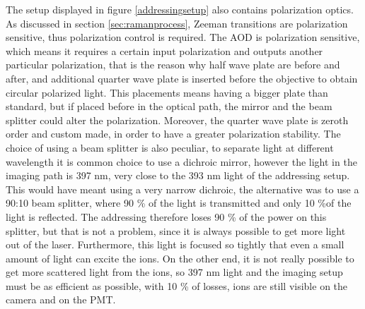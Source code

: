 The setup displayed in figure \ref{addressingsetup} also contains polarization optics. As discussed in section \ref{sec:ramanprocess}, Zeeman transitions are polarization sensitive, thus polarization control is required. The AOD is polarization sensitive, which means it requires a certain input polarization and outputs another particular polarization, that is the reason why half wave plate are before and after, and additional quarter wave plate is inserted before the objective to obtain circular polarized light. This placements means having a bigger plate than standard, but if placed before in the optical path, the mirror and the beam splitter could alter the polarization. Moreover, the quarter wave plate is zeroth order and custom made, in order to have a greater polarization stability. The choice of using a beam splitter is also peculiar, to separate light at different wavelength it is common choice to use a dichroic mirror, however the light in the imaging path is 397 nm, very close to the 393 nm light of the addressing setup. This would have meant using a very narrow dichroic, the alternative was to use a 90:10 beam splitter, where 90 \% of the light is transmitted and only 10 \%of the light is reflected. The addressing therefore loses 90 \% of the power on this splitter, but that is not a problem, since it is always possible to get more light out of the laser. Furthermore, this light is focused so tightly that even a small amount of light can excite the ions. On the other end, it is not really possible to get more scattered light from the ions, so 397 nm light and the imaging setup must be as efficient as possible, with 10 \% of losses, ions are still visible on the camera and on the PMT.


